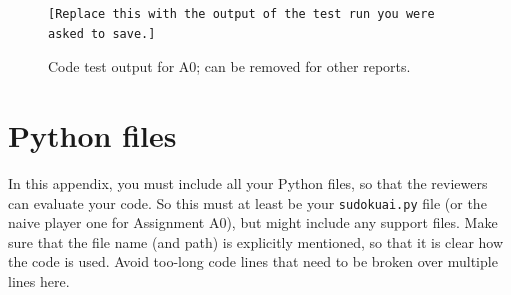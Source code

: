 \documentclass[11pt]{article}
\begin{document}
\begin{figure}
\begin{verbatim}
[Replace this with the output of the test run you were asked to save.]
\end{verbatim}
\caption{Code test output for A0; can be removed for other reports.}
\end{figure}



\clearpage
\appendix

\section*{Python files}
In this appendix, you must include all your Python files, so that the reviewers can evaluate your code.
So this must at least be your \texttt{sudokuai.py} file (or the naive player one for Assignment A0), but might include any support files.
Make sure that the file name (and path) is explicitly mentioned, so that it is clear how the code is used.
Avoid too-long code lines that need to be broken over multiple lines here.


\end{document}
